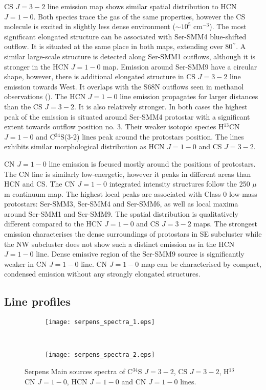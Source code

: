 \documentclass{aa}
\begin{document}
CS $J=3-2$ line emission map shows similar spatial distribution to HCN $J=1-0$. Both species trace the gas of the same properties, however the CS molecule is excited in slightly less dense environment ($\sim 10^5$ cm$^{-3}$). The most significant elongated structure can be associated with Ser-SMM4 blue-shifted outflow. It is situated at the same place in both maps, extending over 80$^{\prime\prime}$. A similar large-scale structure is detected along Ser-SMM1 outflows, although it is stronger in the HCN $J=1-0$ map. Emission around Ser-SMM9 have a circular shape, however, there is additional elongated structure in CS $J=3-2$ line emission towards West. It overlaps with the S68N outflows seen in methanol observations (\citealt{Kri10}). The HCN $J=1-0$  line emission propagates for larger distances than the CS $J=3-2$. It is also relatively stronger. In both cases the highest peak of the emission is situated around Ser-SMM4 protostar with a significant extent towards outflow position no. 3. Their weaker isotopic species H$^{13}$CN $J=1-0$ and \mbox{C$^{34}$S(3-2)} lines peak around the protostars position. The lines exhibits similar morphological distribution as HCN $J=1-0$ and CS $J=3-2$.

CN $J=1-0$ line emission is focused mostly around the positions of protostars. The CN line is similarly low-energetic, however it peaks in different areas than HCN and CS. The CN $J=1-0$ integrated intensity structures follow the 250 $\mu$m continuum map. The highest local peaks are associated with Class 0 low-mass protostars: Ser-SMM3, Ser-SMM4 and Ser-SMM6, as well as local maxima around Ser-SMM1 and Ser-SMM9. The spatial distribution is qualitatively different compared to the HCN $J=1-0$ and CS $J=3-2$ maps. The strongest emission characterises the dense surroundings of protostars in SE subcluster while the NW subcluster does not show such a distinct emission as in the HCN $J=1-0$ line. Dense emissive region of the Ser-SMM9 source is significantly weaker in CN $J=1-0$ line. CN $J=1-0$ map can be characterised by compact, condensed emission without any strongly elongated structures. 


\subsection{Line profiles}

\begin{figure*}

 \begin{subfigure}{.5\textwidth}
  \label{Spectra_1}
	
  \texttt{[image: serpens\_spectra\_1.eps]}
 \end{subfigure}
  \\
 \begin{subfigure}{.5\textwidth}
  \label{Spectra_2}
  \texttt{[image: serpens\_spectra\_2.eps]}
 \end{subfigure}
\caption{Serpens Main sources spectra of C$^{34}$S $J=3-2$, CS $J=3-2$, H$^{13}$CN $J=1-0$, HCN $J=1-0$ and CN $J=1-0$ lines.}
\label{spectra}
\end{figure*}
\end{document}
